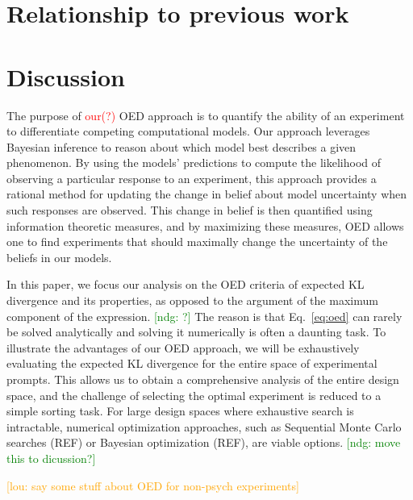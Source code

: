\documentclass{article}
\newcommand{\red}[1]{\textcolor{Red}{#1}}
\newcommand{\ndg}[1]{\textcolor{Green}{[ndg: #1]}}
\newcommand{\lou}[1]{\textcolor{orange}{[lou: #1]}}
\begin{document}
\section{Relationship to previous work}
\section{Discussion}

The purpose of \red{our(?)} OED approach is to quantify the ability of an experiment to differentiate competing computational models. Our approach leverages Bayesian inference to reason about which model best describes a given phenomenon. By using the models' predictions to compute the likelihood of observing a particular response to an experiment, this approach provides a rational method for updating the change in belief about model uncertainty when such responses are observed. This change in belief is then quantified using information theoretic measures, and by maximizing these measures, OED allows one to find experiments that should maximally change the uncertainty of the beliefs in our models.


In this paper, we focus our analysis on the OED criteria of expected KL divergence and its properties, as opposed to the argument of the maximum component of the expression. \ndg{?} The reason is that Eq.~\ref{eq:oed} can rarely be solved analytically and solving it numerically is often a daunting task. To illustrate the advantages of our OED approach, we will be exhaustively evaluating the expected KL divergence for the entire  space of experimental prompts. This allows us to obtain a comprehensive analysis of the entire design space, and the challenge of selecting the optimal experiment is reduced to a simple sorting task. For large design spaces where exhaustive search is intractable, numerical optimization approaches, such as Sequential Monte Carlo searches (REF) or Bayesian optimization (REF), are viable options.  \ndg{move this to dicussion?}



\lou{say some stuff about OED for non-psych experiments}



\end{document}
